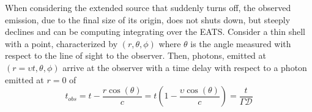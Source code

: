 %

When considering the extended source that suddenly turns off, the observed emission, 
due to the final size of its origin, does not shuts down, but steeply declines and can 
be computing integrating over the \ac{EATS}.
%
Consider a thin shell with a point, characterized by $(r, \theta, \phi)$ where $\theta$ 
is the angle measured with respect to the line of sight to the observer. Then, photons, 
emitted at $(r=\upsilon t, \theta,\phi)$ arrive at the observer with a time delay with 
respect to a photon emitted at $r=0$ of
%
\begin{equation}
t_{obs} = t - \frac{r \cos(\theta)}{c} = t(1-\frac{\upsilon\cos(\theta)}{c}) = \frac{t}{\Gamma\mathcal{D}}
\label{eq:afterglow:tobs}
\end{equation}


